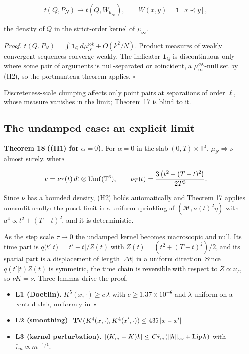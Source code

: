 \[t(Q,P_N)\longrightarrow t(Q,W_{\mu_\infty}),\qquad W(x,y)=\mathbf 1[x\prec y],\]

the density of \(Q\) in the strict-order kernel of
\(\mu_\infty\).

\emph{Proof.}
\(t(Q,P_N)=\int\mathbf 1_Q\,d\mu_N^{\otimes k}+O(k^2/N)\).
Product measures of weakly convergent sequences converge
weakly. The indicator \(\mathbf 1_Q\) is discontinuous only
where some pair of arguments is null-separated or
coincident, a \(\mu_\infty^{\otimes k}\)-null set by (H2),
so the portmanteau theorem applies. \(\square\)

Discreteness-scale clumping affects only point pairs at
separations of order \(\ell\), whose measure vanishes in the
limit; Theorem 17 is blind to it.

\hypertarget{the-undamped-case-an-explicit-limit}{%
\subsection{The undamped case: an explicit
limit}\label{the-undamped-case-an-explicit-limit}}

\textbf{Theorem 18 ((H1) for \(\alpha=0\)).} For
\(\alpha=0\) in the slab \((0,T)\times\mathbb T^3\),
\(\mu_N\Rightarrow\nu\) almost surely, where

\[\nu=\nu_T(t)\,dt\otimes{\rm Unif}(\mathbb T^3),\qquad \nu_T(t)=\frac{3\left(t^2+(T-t)^2\right)}{2T^3}.\]

Since \(\nu\) has a bounded density, (H2) holds
automatically and Theorem 17 applies unconditionally: the
poset limit is a uniform sprinkling of
\((\mathcal M,a(t)^2\eta)\) with \(a^4\propto t^2+(T-t)^2\),
and it is deterministic.

As the step scale \(\tau\to0\) the undamped kernel becomes
macroscopic and null. Its time part is
\(q(t'|t)=|t'-t|/Z(t)\) with \(Z(t)=(t^2+(T-t)^2)/2\), and
its spatial part is a displacement of length \(|\Delta t|\)
in a uniform direction. Since \(q(t'|t)Z(t)\) is symmetric,
the time chain is reversible with respect to
\(Z\propto\nu_T\), so \(\nu K=\nu\). Three lemmas drive the
proof.

\begin{itemize}
\tightlist
\item
  \textbf{L1 (Doeblin).} \(K^5(x,\cdot)\ge c\,\lambda\) with
  \(c\ge1.37\times10^{-6}\) and \(\lambda\) uniform on a
  central slab, uniformly in \(x\).
\item
  \textbf{L2 (smoothing).}
  \({\rm TV}(K^4(x,\cdot),K^4(x',\cdot))\le436\,|x-x'|\).
\item
  \textbf{L3 (kernel perturbation).}
  \(|(K_m-K)h|\le C\bar\tau_m(\|h\|_\infty+{\rm Lip}\,h)\)
  with \(\bar\tau_m\propto m^{-1/4}\).
\end{itemize}

